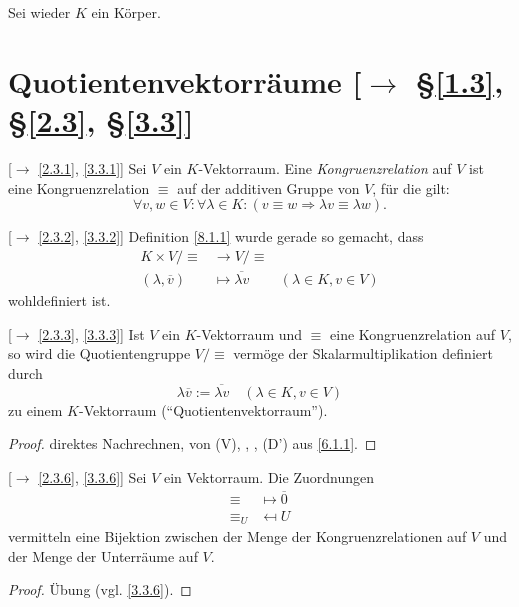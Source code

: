 \documentclass[../../main.tex]{subfiles}
\begin{document}
Sei wieder $K$ ein Körper.

\section[tocentry={Quotientenvektorräume}]{Quotientenvektorräume {\small [$\to$ §\ref{1.3}, §\ref{2.3}, §\ref{3.3}]}}

\begin{df}\label{8.1.1}
[$\to$ \ref{2.3.1}, \ref{3.3.1}] Sei $V$ ein $K$-Vektorraum. Eine \emph{Kongruenzrelation} auf $V$ ist eine Kongruenzrelation $\equiv$ auf der additiven Gruppe von $V$, für die gilt:
\[\forall v,w\in V:\forall\lambda\in K:(v\equiv w \Longrightarrow \lambda v \equiv \lambda w).\]
\end{df}

\begin{bem}\label{8.1.2}
[$\to$ \ref{2.3.2}, \ref{3.3.2}] Definition \ref{8.1.1} wurde gerade so gemacht, dass
\begin{align*}
K \times V/{\equiv} & \to V/{\equiv}\\
(\lambda, \overline{v}) & \mapsto \overline{\lambda v} & (\lambda\in K, v\in V)
\end{align*}
wohldefiniert ist.
\end{bem}

\begin{satdef}\label{8.1.3}
{\rm[$\to$ \ref{2.3.3}, \ref{3.3.3}]} Ist $V$ ein $K$-Vektorraum und $\equiv$ eine Kongruenzrelation auf $V$, so wird die Quotientengruppe $V/{\equiv}$ vermöge der Skalarmultiplikation definiert durch
$$\lambda \overline{v} := \overline{\lambda v}\quad (\lambda \in K, v\in V)$$
zu einem $K$-Vektorraum ("`Quotientenvektorraum"').
\end{satdef}
\begin{proof}
direktes Nachrechnen, von (V), \vecN, \vecD, (D') aus \ref{6.1.1}.
\end{proof}

\begin{sat}\label{8.1.4}
{\rm[$\to$ \ref{2.3.6}, \ref{3.3.6}]} Sei $V$ ein Vektorraum. Die Zuordnungen
\begin{align*}
\equiv & \mapsto \overline{0}\\
\equiv_U & \mapsfrom U
\end{align*}
vermitteln eine Bijektion zwischen der Menge der Kongruenzrelationen auf $V$ und der Menge der Unterräume auf $V$.
\end{sat}
\begin{proof}
Übung (vgl. \ref{3.3.6}).
\end{proof}
\end{document}
